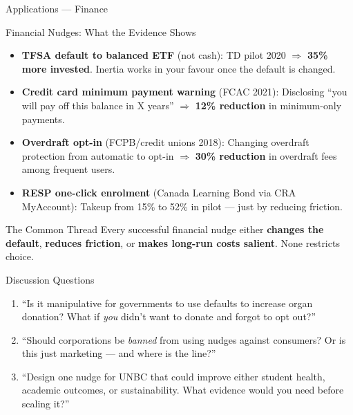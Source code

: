 \documentclass[aspectratio=169]{beamer}
\begin{document}
\begin{frame}{Applications --- Finance}
\begin{block}{Financial Nudges: What the Evidence Shows}
\begin{itemize}
  \item \textbf{TFSA default to balanced ETF} (not cash): TD pilot 2020 $\Rightarrow$ \textbf{35\% more invested}. Inertia works in your favour once the default is changed.
  \item \textbf{Credit card minimum payment warning} (FCAC 2021): Disclosing ``you will pay off this balance in X years'' $\Rightarrow$ \textbf{12\% reduction} in minimum-only payments.
  \item \textbf{Overdraft opt-in} (FCPB/credit unions 2018): Changing overdraft protection from automatic to opt-in $\Rightarrow$ \textbf{30\% reduction} in overdraft fees among frequent users.
  \item \textbf{RESP one-click enrolment} (Canada Learning Bond via CRA MyAccount): Takeup from 15\% to 52\% in pilot --- just by reducing friction.
\end{itemize}
\end{block}
\begin{exampleblock}{The Common Thread}
Every successful financial nudge either \textbf{changes the default}, \textbf{reduces friction}, or \textbf{makes long-run costs salient}. None restricts choice.
\end{exampleblock}
\end{frame}

\begin{frame}{Discussion Questions}
\begin{enumerate}
  \item[\textcolor{bepurple}{Q1.}] ``Is it manipulative for governments to use defaults to increase organ donation? What if \textit{you} didn't want to donate and forgot to opt out?''
  \medskip
  \item[\textcolor{beteal}{Q2.}] ``Should corporations be \textit{banned} from using nudges against consumers? Or is this just marketing --- and where is the line?''
  \medskip
  \item[\textcolor{berust}{Q3.}] ``Design one nudge for UNBC that could improve either student health, academic outcomes, or sustainability. What evidence would you need before scaling it?''
\end{enumerate}
\end{frame}
\end{document}
